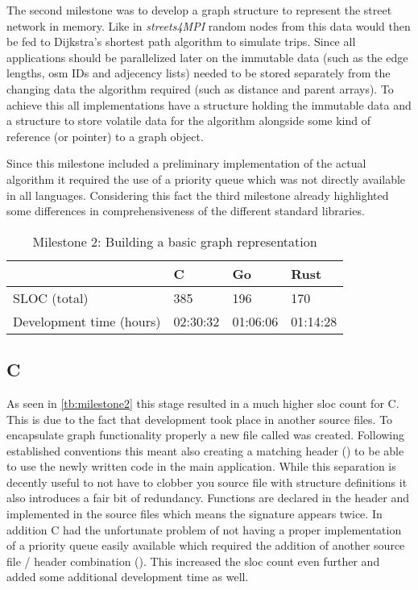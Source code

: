 The second milestone was to develop a graph structure to represent the street network in memory. Like in \textit{streets4MPI} random nodes from this data would then be fed to Dijkstra's shortest path algorithm to simulate trips. Since all applications should be parallelized later on the immutable data (such as the edge lengths, \gls{osm} IDs and adjecency lists) needed to be stored separately from the changing data the algorithm required (such as distance and parent arrays). To achieve this all implementations have a  structure holding the immutable data and a  structure to store volatile data for the algorithm alongside some kind of reference (or pointer) to a graph object.

Since this milestone included a preliminary implementation of the actual algorithm it required the use of a priority queue which was not directly available in all languages. Considering this fact the third milestone already highlighted some differences in comprehensiveness of the different standard libraries.

\begin{table}[htb]
    \centering
    \begin{tabular}{llll}
        \toprule
            & C
            & Go
            & Rust \\
        \midrule

        SLOC (total)
            & 385
            & 196
            & 170 \\

        Development time (hours)
            & 02:30:32
            & 01:06:06
            & 01:14:28 \\
        \bottomrule
    \end{tabular}
    \caption{Milestone 2: Building a basic graph representation}
    \label{tb:milestone2}
\end{table}

\subsection{C}
\label{subsec:Implementation::Graph_Representation::C}

As seen in \autoref{tb:milestone2} this stage resulted in a much higher \gls{sloc} count for C. This is due to the fact that development took place in another source files. To encapsulate graph functionality properly a new file called  was created. Following established conventions this meant also creating a matching header () to be able to use the newly written code in the main application. While this separation is decently useful to not have to clobber you source file with structure definitions it also introduces a fair bit of redundancy. Functions are declared in the header and implemented in the source files which means the signature appears twice. In addition C had the unfortunate problem of not having a proper implementation of a priority queue easily available which required the addition of another source file / header combination (). This increased the \gls{sloc} count even further and added some additional development time as well.

